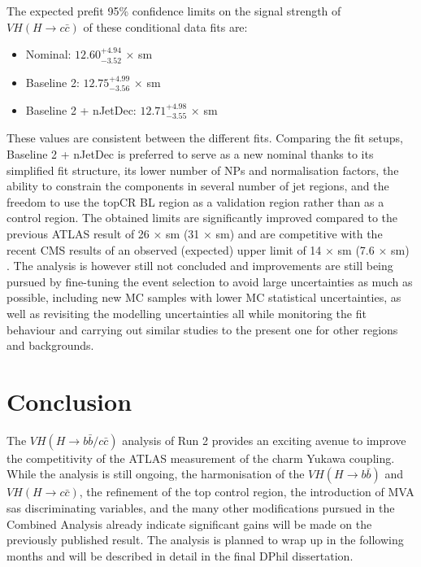 The expected prefit 95\% confidence limits on the signal strength of $VH(H\rightarrow c\bar{c})$ of these conditional data fits are: 
\begin{itemize}
\item Nominal: $12.60^{+4.94}_{-3.52}$ × \gls{sm}
\item Baseline 2: $12.75^{+4.99}_{-3.56}$ × \gls{sm}
\item Baseline 2 + nJetDec: $12.71^{+4.98}_{-3.55}$ × \gls{sm}
\end{itemize}
These values are consistent between the different fits. Comparing the fit setups, Baseline 2 + nJetDec is preferred to serve as a new nominal thanks to its simplified fit structure, its lower number of NPs and normalisation factors, the ability to constrain the components in several number of jet regions, and the freedom to use the topCR BL region as a validation region rather than as a control region. The obtained limits are significantly improved compared to the previous ATLAS result of 26 × \gls{sm} (31 × \gls{sm}) \cite{Collaboration:2721696} and are competitive with the recent CMS results of an observed (expected) upper limit of 14 $\times$ \gls{sm} (7.6 $\times$ \gls{sm}) \cite{arXiv:2205.05550}. The analysis is however still not concluded and improvements are still being pursued by fine-tuning the event selection to avoid large uncertainties as much as possible, including new MC samples with lower MC statistical uncertainties, as well as revisiting the modelling uncertainties all while monitoring the fit behaviour and carrying out similar studies to the present one for other regions and backgrounds. 

\section{Conclusion}
The $VH(H\rightarrow b\bar{b}/c\bar{c})$ analysis of Run 2 provides an exciting avenue to improve the competitivity of the ATLAS measurement of the charm Yukawa coupling. While the analysis is still ongoing, the harmonisation of the $VH(H\rightarrow b\bar{b})$ and $VH(H\rightarrow c\bar{c})$, the refinement of the top control region, the introduction of MVA sas discriminating variables, and the many other modifications pursued in the Combined Analysis already indicate significant gains will be made on the previously published result. The analysis is planned to wrap up in the following months and will be described in detail in the final DPhil dissertation. 

\clearpage

